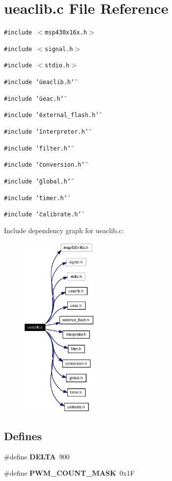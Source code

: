 \section{ueaclib.c File Reference}
\label{ueaclib_8c}
{\tt \#include $<$msp430x16x.h$>$}\par
{\tt \#include $<$signal.h$>$}\par
{\tt \#include $<$stdio.h$>$}\par
{\tt \#include \char`\"{}ueaclib.h\char`\"{}}\par
{\tt \#include \char`\"{}ueac.h\char`\"{}}\par
{\tt \#include \char`\"{}external\_\-flash.h\char`\"{}}\par
{\tt \#include \char`\"{}interpreter.h\char`\"{}}\par
{\tt \#include \char`\"{}filter.h\char`\"{}}\par
{\tt \#include \char`\"{}conversion.h\char`\"{}}\par
{\tt \#include \char`\"{}global.h\char`\"{}}\par
{\tt \#include \char`\"{}timer.h\char`\"{}}\par
{\tt \#include \char`\"{}calibrate.h\char`\"{}}\par


Include dependency graph for ueaclib.c:\begin{figure}[H]
\begin{center}
\leavevmode
\includegraphics[width=108pt]{ueaclib_8c__incl}
\end{center}
\end{figure}
\subsection*{Defines}
\begin{CompactItemize}
\item 
\#define {\bf DELTA}~900
\item 
\#define {\bf PWM\_\-COUNT\_\-MASK}~0x1F
\end{CompactItemize}
